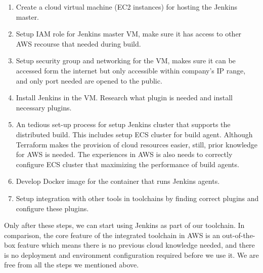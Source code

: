 \begin{enumerate} 
 \item Create a cloud virtual machine (EC2 instances) for hosting the Jenkins master.
 \item Setup IAM role for Jenkins master VM, make sure it has access to other AWS recourse that needed during build.
 \item Setup security group and networking for the VM, makes sure it can be accessed form the internet but only accessible within company's IP range, and only port needed are opened to the public.
 \item Install Jenkins in the VM. Research what plugin is needed and install necessary plugins.
 \item An tedious set-up process for setup Jenkins cluster that supports the distributed build. This includes setup ECS cluster for build agent. Although Terraform makes the provision of cloud resources easier, still, prior knowledge for AWS is needed. The experiences in AWS is also needs to correctly configure ECS cluster that maximizing the performance of build agents.
 \item Develop Docker image for the container that runs Jenkins agents.
 \item Setup integration with other tools in toolchains by finding correct plugins and configure these plugins. 
\end{enumerate}
Only after these steps, we can start using Jenkins as part of our toolchain.
In comparison, the core feature of the integrated toolchain in AWS is an out-of-the-box feature which means there is no previous cloud knowledge needed, and there is no deployment and environment configuration required before we use it. We are free from all the steps we mentioned above.
